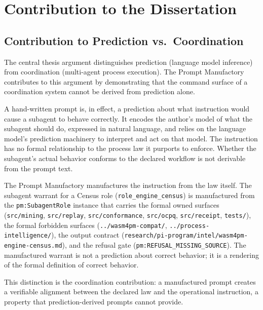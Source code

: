 
\section{Contribution to the Dissertation}
\label{sec:research-prompt-manufactory-contribution}

\subsection{Contribution to Prediction vs.~Coordination}
\label{sec:research-prompt-manufactory-contribution-prediction}

The central thesis argument distinguishes prediction (language model inference) from
coordination (multi-agent process execution). The Prompt Manufactory contributes to this
argument by demonstrating that the command surface of a coordination system cannot be
derived from prediction alone.

A hand-written prompt is, in effect, a prediction about what instruction would cause a
subagent to behave correctly. It encodes the author's model of what the subagent should
do, expressed in natural language, and relies on the language model's prediction
machinery to interpret and act on that model. The instruction has no formal relationship
to the process law it purports to enforce. Whether the subagent's actual behavior
conforms to the declared workflow is not derivable from the prompt text.

The Prompt Manufactory manufactures the instruction from the law itself. The subagent
warrant for a Census role (\texttt{role\_engine\_census}) is manufactured from the
\texttt{pm:SubagentRole} instance that carries the formal owned surfaces
(\texttt{src/mining}, \texttt{src/replay}, \texttt{src/conformance}, \texttt{src/ocpq},
\texttt{src/receipt}, \texttt{tests/}), the formal forbidden surfaces
(\texttt{../wasm4pm-compat/}, \texttt{../process-intelligence/}), the output contract
(\texttt{research/pi-program/intel/wasm4pm-engine-census.md}), and the refusal gate
(\texttt{pm:REFUSAL\_MISSING\_SOURCE}). The manufactured warrant is not a prediction
about correct behavior; it is a rendering of the formal definition of correct behavior.

This distinction is the coordination contribution: a manufactured prompt creates a
verifiable alignment between the declared law and the operational instruction, a
property that prediction-derived prompts cannot provide.

